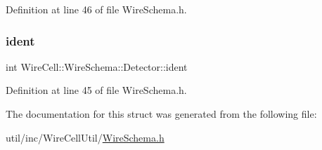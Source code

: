 Definition at line 46 of file Wire\+Schema.\+h.

\mbox{\label{struct_wire_cell_1_1_wire_schema_1_1_detector_a0c682269dd4c3dea3b0095d6bbce1938}} 
\subsubsection{\texorpdfstring{ident}{ident}}
{\footnotesize\ttfamily int Wire\+Cell\+::\+Wire\+Schema\+::\+Detector\+::ident}



Definition at line 45 of file Wire\+Schema.\+h.



The documentation for this struct was generated from the following file\+:\begin{DoxyCompactItemize}
\item 
util/inc/\+Wire\+Cell\+Util/\hyperlink{_wire_schema_8h}{Wire\+Schema.\+h}\end{DoxyCompactItemize}
